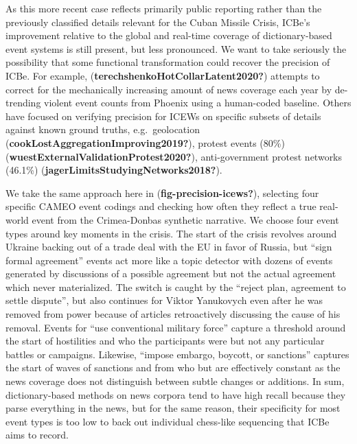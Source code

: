 \documentclass{article}
\begin{document}
As this more recent case reflects primarily public reporting rather than
the previously classified details relevant for the Cuban Missile Crisis,
ICBe's improvement relative to the global and real-time coverage of
dictionary-based event systems is still present, but less pronounced. We
want to take seriously the possibility that some functional
transformation could recover the precision of ICBe. For example,
(\textbf{terechshenkoHotCollarLatent2020?}) attempts to correct for the
mechanically increasing amount of news coverage each year by de-trending
violent event counts from Phoenix using a human-coded baseline. Others
have focused on verifying precision for ICEWs on specific subsets of
details against known ground truths, e.g.~geolocation
(\textbf{cookLostAggregationImproving2019?}), protest events (80\%)
(\textbf{wuestExternalValidationProtest2020?}), anti-government protest
networks (46.1\%) (\textbf{jagerLimitsStudyingNetworks2018?}).

We take the same approach here in (\textbf{fig-precision-icews?}),
selecting four specific CAMEO event codings and checking how often they
reflect a true real-world event from the Crimea-Donbas synthetic
narrative. We choose four event types around key moments in the crisis.
The start of the crisis revolves around Ukraine backing out of a trade
deal with the EU in favor of Russia, but ``sign formal agreement''
events act more like a topic detector with dozens of events generated by
discussions of a possible agreement but not the actual agreement which
never materialized. The switch is caught by the ``reject plan, agreement
to settle dispute'', but also continues for Viktor Yanukovych even after
he was removed from power because of articles retroactively discussing
the cause of his removal. Events for ``use conventional military force''
capture a threshold around the start of hostilities and who the
participants were but not any particular battles or campaigns. Likewise,
``impose embargo, boycott, or sanctions'' captures the start of waves of
sanctions and from who but are effectively constant as the news coverage
does not distinguish between subtle changes or additions. In sum,
dictionary-based methods on news corpora tend to have high recall
because they parse everything in the news, but for the same reason,
their specificity for most event types is too low to back out individual
chess-like sequencing that ICBe aims to record.
\end{document}
